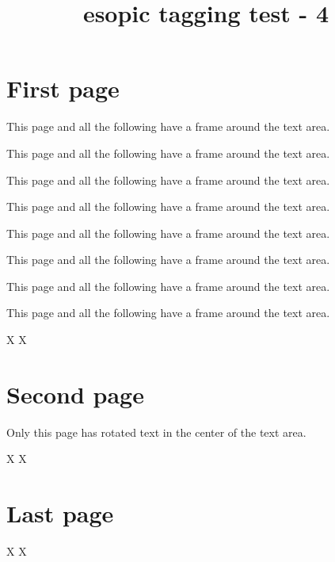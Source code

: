 \documentclass[a4paper,twoside]{article}
\title{esopic tagging test - 4}
\begin{document}
  \section*{First page}
  

  This page and all the following have a frame around the
  text area. \par
  This page and all the following have a frame around the
  text area. \par
  This page and all the following have a frame around the
  text area. \par
  This page and all the following have a frame around the
  text area. \par
  This page and all the following have a frame around the
  text area. \par
  This page and all the following have a frame around the
  text area. \par
  This page and all the following have a frame around the
  text area. \par
  This page and all the following have a frame around the
  text area. \par

  \vfill
  X \hfill X\newpage

  \section*{Second page}


  Only this page has rotated text in the center of the text area.

  \vfill
  X \hfill X\newpage

  \section*{Last page}

  \vfill
  X \hfill X
\end{document}
